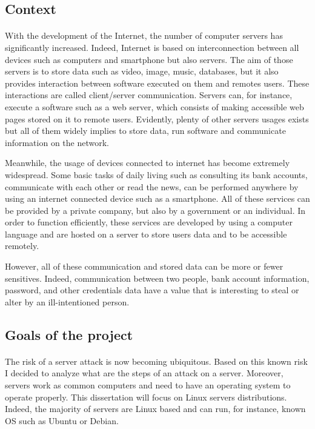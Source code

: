 \subsection{Context}

\paragraph{} %
With the development of the Internet, the number of computer servers has significantly
increased. Indeed, Internet is based on interconnection between all devices such as computers
and smartphone but also servers. The aim of those servers is to store data such as video,
 image, music, databases, but it also provides interaction between software executed on them and 
 remotes users. These interactions are called client/server communication. Servers can, for 
 instance, execute a software such as a web server, which consists of making accessible web pages
 stored on it to remote users. Evidently, plenty of other servers usages exists but all of them
 widely implies to store data, run software and communicate information on the network.
 
Meanwhile, the usage of devices connected to internet has become extremely widespread. Some
basic tasks of daily living such as consulting its bank accounts, communicate with each other
 or read the news, can be performed anywhere by using an internet connected device such as a
 smartphone.
All of these services can be provided by a private company, but also by a government or an
 individual. In order to function efficiently, these services are developed by using a 
 computer language and are hosted on a server to store users data and to be accessible remotely. 

However, all of these communication and stored data can be more or fewer sensitives. Indeed, 
communication between two people, bank account information, password, and other credentials data
 have a value that is interesting to steal or alter by an ill-intentioned person.

\subsection{Goals of the project} %

\paragraph{}

The risk of a server attack is now becoming ubiquitous. Based on this known risk I decided
 to analyze what are the steps of an attack on a server. Moreover, servers work as common
 computers and need to have an operating system to operate properly. This dissertation will
 focus on Linux servers distributions. Indeed, the majority of servers are Linux based and
 can run, for instance, known OS such as Ubuntu or Debian.
 
